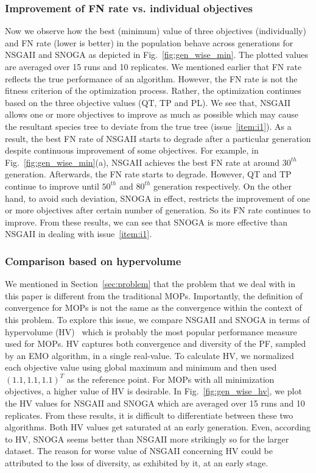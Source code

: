 \subsubsection{Improvement of FN rate vs. individual objectives} Now we observe how the best (minimum) value of three objectives (individually) and FN rate (lower is better) in the population behave across generations for NSGAII and SNOGA as depicted in Fig.~\ref{fig:gen_wise_min}. The plotted values are averaged over 15 runs and 10 replicates. We mentioned earlier that FN rate reflects the true performance of an algorithm. However, the FN rate is not the fitness criterion of the optimization process. Rather, the optimization continues based on the three objective values (QT, TP and PL).
We see that, NSGAII allows one or more objectives to improve as much as possible which may cause the resultant species tree to deviate from the true tree (issue~\ref{item:i1}). As a result, the best FN rate of NSGAII starts to degrade after a particular generation despite continuous improvement of some objectives. For example, in Fig.~\ref{fig:gen_wise_min}(a), NSGAII achieves the best FN rate at around $ 30^{th} $ generation. Afterwards, the FN rate starts to degrade. However, QT and TP continue to improve until $ 50^{th} $ and $ 80^{th} $ generation respectively.
On the other hand, to avoid such deviation, SNOGA in effect, restricts the improvement of one or more objectives after certain number of generation. So its FN rate continues to improve. From these results, we can see that SNOGA is more effective than NSGAII in dealing with issue~\ref{item:i1}.


\subsubsection{Comparison based on hypervolume} We mentioned in Section~\ref{sec:problem} that the problem that we deal with in this paper is different from the traditional MOPs. Importantly, the definition of convergence for MOPs is not the same as the convergence within the context of this problem. To explore this issue, we compare NSGAII and SNOGA in terms of hypervolume (HV)~\cite{zitzler1999multiobjective} which is probably the most popular performance measure used for MOPs. HV captures both convergence and diversity of the PF, sampled by an EMO algorithm, in a single real-value. To calculate HV, we normalized each objective value using global maximum and minimum and then used $(1.1, 1.1, 1.1)^T$ as the reference point. For MOPs with all minimization objectives, a higher value of HV is desirable. In Fig.~\ref{fig:gen_wise_hv}, we plot the HV values for NSGAII and SNOGA which are averaged over 15 runs and 10 replicates. From these results, it is difficult to differentiate between these two algorithms. Both HV values get saturated at an early generation. Even, according to HV, SNOGA seems better than NSGAII more strikingly so for the larger dataset. The reason for worse value of NSGAII concerning HV could be attributed to the loss of diversity, as exhibited by it, at an early stage. 

